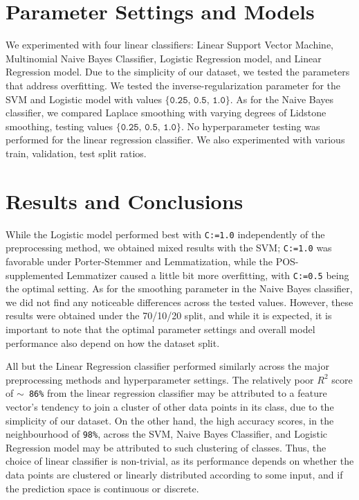 \documentclass[11pt]{article}
\begin{document}
\section{Parameter Settings and Models}
We experimented with four linear classifiers: 
Linear Support Vector Machine, 
Multinomial Naive Bayes Classifier, 
Logistic Regression model, 
and Linear Regression model. Due to the 
simplicity of our dataset, we tested the parameters
that address overfitting.
We tested the inverse-regularization parameter
for the SVM and Logistic model with values $\{\texttt{0.25, 0.5, 1.0}\}$.
As for the Naive Bayes classifier, 
we compared Laplace smoothing 
with varying degrees of Lidstone smoothing,
testing values $\{\texttt{0.25, 0.5, 1.0}\}$. 
No hyperparameter testing was performed for the linear regression classifier.
We also experimented with various train, validation, test split ratios.


\section{Results and Conclusions}
While the Logistic model performed best with \texttt{C:=1.0} independently of
the preprocessing method, we obtained mixed results with the SVM;
\texttt{C:=1.0} was favorable under Porter-Stemmer and Lemmatization,
while the POS-supplemented Lemmatizer caused a little bit more overfitting,
with \texttt{C:=0.5} being the optimal setting. 
As for the smoothing parameter in the Naive Bayes classifier, 
we did not find any noticeable differences across the tested values.
However, these results were obtained under the 70/10/20 split, 
and while it is expected, it is important to note that 
the optimal parameter settings and overall model performance 
also depend on how the dataset split.

All but the Linear Regression classifier
performed similarly across the major preprocessing methods 
and hyperparameter settings.
The relatively 
poor $R^2$ score of  \texttt{$\sim$ 86\%} from the linear regression classifier
may be attributed to a feature vector's tendency to join
a cluster of other data points in its class, due to the 
simplicity of our dataset.
On the other hand,
the high accuracy scores, in the neighbourhood of \texttt{98\%}, across the 
SVM, Naive Bayes Classifier, and Logistic Regression model may be attributed
to such clustering of classes. 
Thus, the choice of linear classifier is non-trivial, as its
performance depends
on whether the data points are clustered 
or linearly distributed according to some input,
and if the prediction space is continuous or discrete.
\end{document}

